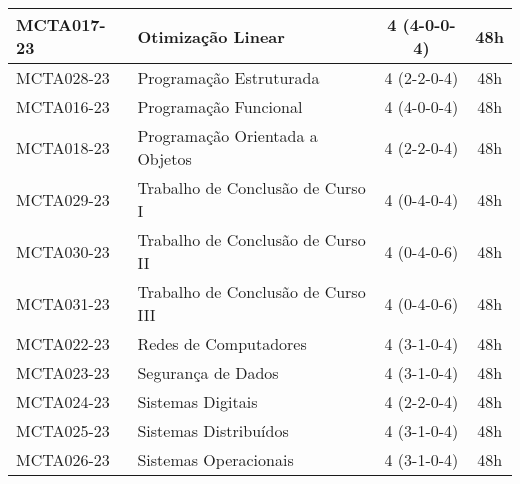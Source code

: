 \begin{table}[!h]
\begin{tabular}{|l|p{}|c|c|}
        \hline
        MCTA017-23 & Otimização Linear & 4 (4-0-0-4) & 48h \\
        \hline
        MCTA028-23 & Programação Estruturada & 4 (2-2-0-4) & 48h \\
        \hline
        MCTA016-23 & Programação Funcional & 4 (4-0-0-4) & 48h \\
        \hline
        MCTA018-23 & Programação Orientada a Objetos & 4 (2-2-0-4) & 48h \\
        \hline
        MCTA029-23 & Trabalho de Conclusão de Curso I & 4 (0-4-0-4) & 48h \\
        \hline
        MCTA030-23 & Trabalho de Conclusão de Curso II & 4 (0-4-0-6) & 48h \\
        \hline
        MCTA031-23 & Trabalho de Conclusão de Curso III & 4 (0-4-0-6) & 48h \\
        \hline
        MCTA022-23 & Redes de Computadores & 4 (3-1-0-4) & 48h \\
        \hline
        MCTA023-23 & Segurança de Dados & 4 (3-1-0-4) & 48h \\
        \hline
        MCTA024-23 & Sistemas Digitais & 4 (2-2-0-4) & 48h \\
        \hline
        MCTA025-23 & Sistemas Distribuídos & 4 (3-1-0-4) & 48h \\
        \hline
        MCTA026-23 & Sistemas Operacionais & 4 (3-1-0-4) & 48h\\
        \hline
    \end{tabular}
\end{table}

